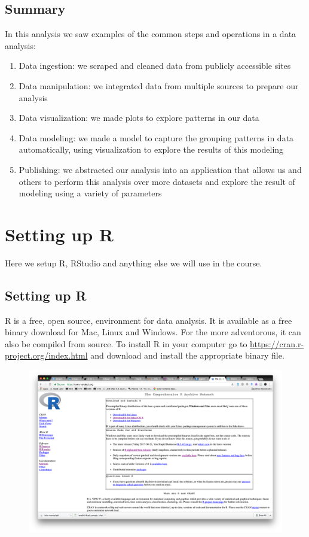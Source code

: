 \documentclass[12pt,]{book}
\theoremstyle{definition}
\theoremstyle{definition}
\theoremstyle{definition}
\theoremstyle{remark}
\begin{document}
\section{Summary}\label{summary}

In this analysis we saw examples of the common steps and operations in a
data analysis:

\begin{enumerate}
\def\labelenumi{\arabic{enumi})}
\item
  Data ingestion: we scraped and cleaned data from publicly accessible
  sites
\item
  Data manipulation: we integrated data from multiple sources to prepare
  our analysis
\item
  Data visualization: we made plots to explore patterns in our data
\item
  Data modeling: we made a model to capture the grouping patterns in
  data automatically, using visualization to explore the results of this
  modeling
\item
  Publishing: we abstracted our analysis into an application that allows
  us and others to perform this analysis over more datasets and explore
  the result of modeling using a variety of parameters
\end{enumerate}

\chapter{Setting up R}\label{setting-up-r}

Here we setup R, RStudio and anything else we will use in the course.

\section{Setting up R}\label{setting-up-r-1}

R is a free, open source, environment for data analysis. It is available
as a free binary download for Mac, Linux and Windows. For the more
adventorous, it can also be compiled from source. To install R in your
computer go to \url{https://cran.r-project.org/index.html} and download
and install the appropriate binary file.

\begin{figure}
\centering
\includegraphics{img/cran.png}
\caption{}
\end{figure}
\end{document}
